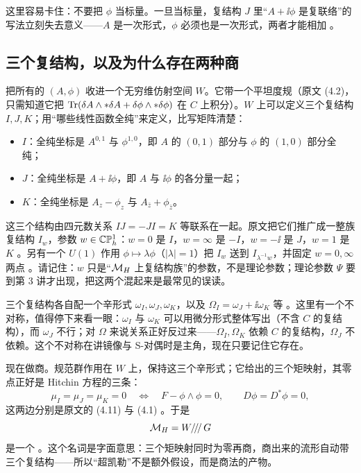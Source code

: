 这里容易卡住：不要把 $\phi$ 当标量。一旦当标量，复结构 $J$ 里“$A+\ii\phi$ 是复联络”的写法立刻失去意义——$A$ 是一次形式，$\phi$ 必须也是一次形式，两者才能相加 。

\subsection{三个复结构，以及为什么存在两种商}

把所有的 $(A,\phi)$ 收进一个无穷维仿射空间 $W$。它带一个平坦度规（原文 (4.2)，只需知道它把 $\operatorname{Tr}(\delta A\wedge*\delta A+\delta\phi\wedge*\delta\phi)$ 在 $C$ 上积分）。$W$ 上可以定义三个复结构 $I,J,K$；用“哪些线性函数全纯”来定义，比写矩阵清楚：

\begin{itemize}
\item $I$：全纯坐标是 $A^{0,1}$ 与 $\phi^{1,0}$，即 $A$ 的 $(0,1)$ 部分与 $\phi$ 的 $(1,0)$ 部分全纯；
\item $J$：全纯坐标是 $A+\ii\phi$，即 $A$ 与 $\ii\phi$ 的各分量一起；
\item $K$：全纯坐标是 $A_z-\phi_z$ 与 $A_{\bar z}+\phi_{\bar z}$。
\end{itemize}

这三个结构由四元数关系 $IJ=-JI=K$ 等联系在一起。原文把它们推广成一整族复结构 $I_w$，参数 $w\in\mathbb{C}\mathbb{P}^1_h$：$w=0$ 是 $I$，$w=\infty$ 是 $-I$，$w=-\ii$ 是 $J$，$w=1$ 是 $K$ 。另有一个 $U(1)$ 作用 $\phi\mapsto\lambda\phi$（$|\lambda|=1$）把 $I_w$ 送到 $I_{\lambda^{-1}w}$，并固定 $w=0,\infty$ 两点 。请记住：$w$ 只是“$\mathcal{M}_{H}$ 上复结构族”的参数，不是理论参数；理论参数 $\Psi$ 要到第 3 讲才出现，把这两个混起来是最常见的误读。

三个复结构各自配一个辛形式 $\omega_I,\omega_J,\omega_K$，以及 $\Omega_I=\omega_J+\ii\omega_K$ 等 。这里有一个不对称，值得停下来看一眼：$\omega_I$ 与 $\omega_K$ 可以用微分形式整体写出（不含 $C$ 的复结构），而 $\omega_J$ 不行；对 $\Omega$ 来说关系正好反过来——$\Omega_I,\Omega_K$ 依赖 $C$ 的复结构，$\Omega_J$ 不依赖。这个不对称在讲镜像与 S-对偶时是主角，现在只要记住它存在。

现在做商。规范群作用在 $W$ 上，保持这三个辛形式；它给出的三个矩映射，其零点正好是 Hitchin 方程的三条：
\[
\mu_I=\mu_J=\mu_K=0
\quad\Longleftrightarrow\quad
F-\phi\wedge\phi=0,\qquad D\phi=D^*\phi=0 ,
\]
这两边分别是原文的 (4.11) 与 (4.1) 。于是
\[
\mathcal{M}_{H}=W/\!/\!/\,G
\]
是一个  。这个名词是字面意思：三个矩映射同时为零再商，商出来的流形自动带三个复结构——所以“超凯勒”不是额外假设，而是商法的产物。

